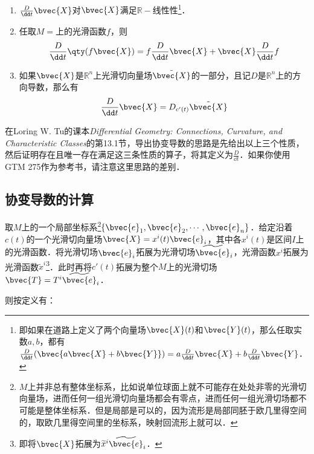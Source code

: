 \begin{enumerate}
\item $\frac{D}{\dd t}\bvec{X}$对$\bvec{X}$满足$\mathbb{R}-$线性性\footnote{即如果在道路上定义了两个向量场$\bvec{X}(t)$和$\bvec{Y}(t)$，那么任取实数$a, b$，都有$\frac{D}{\dd t}(\bvec{a\bvec{X}+b\bvec{Y}})=a\frac{D}{\dd t}\bvec{X}+b\frac{D}{\dd t}\bvec{Y}$．}．
\item 任取$M=$上的光滑函数$f$，则
\begin{equation}
\frac{D}{\dd t}\qty(f\bvec{X})=f\frac{D}{\dd t}\bvec{X}+\bvec{X}\frac{D}{\dd t}f
\end{equation}
\item 如果$\bvec{X}$是$\mathbb{R}^n$上光滑切向量场$\tilde{\bvec{X}}$的一部分，且记$D$是$\mathbb{R}^n$上的方向导数，那么有
\begin{equation}
\frac{D}{\dd t}\bvec{X}=D_{c'(t)}\tilde{\bvec{X}}
\end{equation}

\end{enumerate}

在Loring W. Tu的课本\textsl{Differential Geometry: Connections, Curvature, and Characteristic Classes}\cite{GTM275}的第13.1节，导出协变导数的思路是先给出以上三个性质，然后证明存在且唯一存在满足这三条性质的算子，将其定义为$\frac{D}{\dd t}$．如果你使用GTM 275作为参考书，请注意这里思路的差别．



\subsection{协变导数的计算}

取$M$上的一个局部坐标系\footnote{$M$上并非总有整体坐标系，比如说单位球面上就不可能存在处处非零的光滑切向量场，进而任何一组光滑切向量场都会有零点，进而任何一组光滑切场都不可能是整体坐标系．但是局部是可以的，因为流形是局部同胚于欧几里得空间的，取欧几里得空间里的坐标系，映射回流形上就可以．}$\{\bvec{e}_1, \bvec{e}_2, \cdots, \bvec{e}_n\}$．给定沿着$c(t)$的一个光滑切向量场$\bvec{X}=x^i(t)\bvec{e}_i$，其中各$x^i(t)$是区间$I$上的光滑函数．将光滑切场$\bvec{e}_i$拓展为光滑切场$\widetilde{\bvec{e}}_i$，光滑函数$x^i$拓展为光滑函数$\widetilde{x}^i$\footnote{即将$\bvec{X}$拓展为$\widetilde{x}^i\widetilde{\bvec{e}}_i$．}．此时再将$c'(t)$拓展为整个$M$上的光滑切场$\bvec{T}=T^i\widetilde{\bvec{e}}_i$．

则按定义有：

